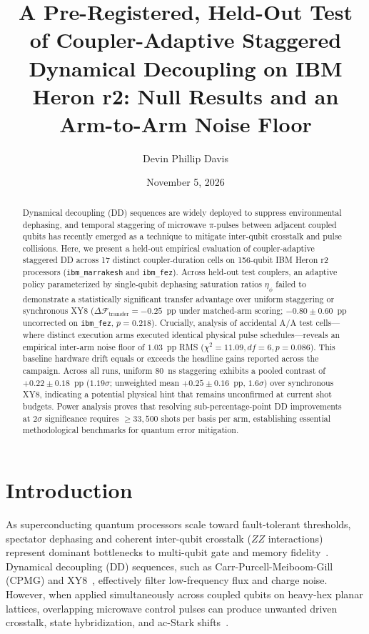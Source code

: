 \documentclass[aps,prl,twocolumn,amsmath,amssymb,superscriptaddress,floatfix]{revtex4-2}
\begin{document}
\title{A Pre-Registered, Held-Out Test of Coupler-Adaptive Staggered Dynamical Decoupling on IBM Heron r2: Null Results and an Arm-to-Arm Noise Floor}

\author{Devin Phillip Davis}

\date{November 5, 2026}

\begin{abstract}
Dynamical decoupling (DD) sequences are widely deployed to suppress environmental dephasing, and temporal staggering of microwave $\pi$-pulses between adjacent coupled qubits has recently emerged as a technique to mitigate inter-qubit crosstalk and pulse collisions. Here, we present a held-out empirical evaluation of coupler-adaptive staggered DD across 17 distinct coupler-duration cells on 156-qubit IBM Heron r2 processors (\texttt{ibm\_marrakesh} and \texttt{ibm\_fez}). Across held-out test couplers, an adaptive policy parameterized by single-qubit dephasing saturation ratios $\eta_\phi$ failed to demonstrate a statistically significant transfer advantage over uniform staggering or synchronous XY8 ($\Delta \mathcal{F}_{\text{transfer}} = -0.25$~pp under matched-arm scoring; $-0.80 \pm 0.60$~pp uncorrected on \texttt{ibm\_fez}, $p = 0.218$). Crucially, analysis of accidental A/A test cells---where distinct execution arms executed identical physical pulse schedules---reveals an empirical inter-arm noise floor of $1.03$~pp RMS ($\chi^2 = 11.09, df = 6, p = 0.086$). This baseline hardware drift equals or exceeds the headline gains reported across the campaign. Across all runs, uniform 80~ns staggering exhibits a pooled contrast of $+0.22 \pm 0.18$~pp ($1.19\sigma$; unweighted mean $+0.25 \pm 0.16$~pp, $1.6\sigma$) over synchronous XY8, indicating a potential physical hint that remains unconfirmed at current shot budgets. Power analysis proves that resolving sub-percentage-point DD improvements at $2\sigma$ significance requires $\ge 33,500$ shots per basis per arm, establishing essential methodological benchmarks for quantum error mitigation.
\end{abstract}

\maketitle

\section{Introduction}
As superconducting quantum processors scale toward fault-tolerant thresholds, spectator dephasing and coherent inter-qubit crosstalk ($ZZ$ interactions) represent dominant bottlenecks to multi-qubit gate and memory fidelity~\cite{Krantz2019, Gambetta2012}. Dynamical decoupling (DD) sequences, such as Carr-Purcell-Meiboom-Gill (CPMG) and XY8~\cite{Viola1998, Viola1999, Ezzell2023, Pokharel2023}, effectively filter low-frequency flux and charge noise. However, when applied simultaneously across coupled qubits on heavy-hex planar lattices, overlapping microwave control pulses can produce unwanted driven crosstalk, state hybridization, and ac-Stark shifts~\cite{Mundada2019}.
\end{document}

